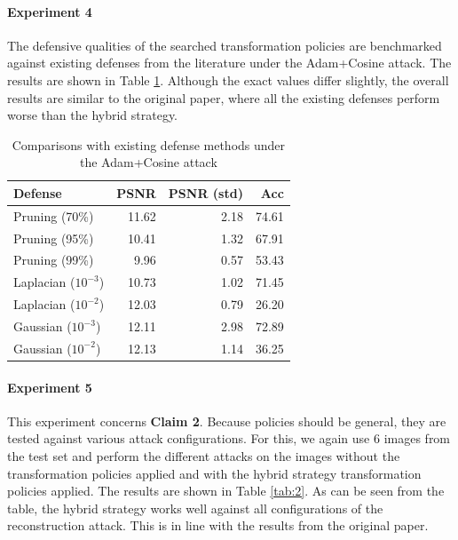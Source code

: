\paragraph{Experiment 4} The defensive qualities of the searched transformation policies are benchmarked against existing defenses from the literature \cite{zhu2019} \cite{wei2020} under the Adam+Cosine attack. The results are shown in Table \ref{tab:3}. Although the exact values differ slightly, the overall results are similar to the original paper, where all the existing defenses perform worse than the hybrid strategy.

\begin{table}[htb]
    \centering
        \begin{tabular}{lrrr}
        \hline
         Defense               &   PSNR &   PSNR (std) &   Acc \\
        \hline
         Pruning (70\%)         &       11.62 &       2.18 & 74.61 \\
         Pruning (95\%)         &       10.41 &       1.32 & 67.91 \\
         Pruning (99\%)         &        9.96 &       0.57 & 53.43 \\
         Laplacian ($10^{-3}$) &       10.73 &       1.02 & 71.45 \\
         Laplacian ($10^{-2}$) &       12.03 &       0.79 & 26.20 \\
         Gaussian ($10^{-3}$)  &       12.11 &       2.98 & 72.89 \\
         Gaussian ($10^{-2}$)  &       12.13 &       1.14 & 36.25 \\
        \hline
    \end{tabular}
    \caption{Comparisons with existing defense methods under the Adam+Cosine attack}
    \label{tab:3}
    \vspace{-8mm}
\end{table}

\paragraph{Experiment 5} This experiment concerns \textbf{Claim 2}. Because policies should be general, they are tested against various attack configurations. For this, we again use $6$ images from the test set and perform the different attacks on the images without the transformation policies applied and with the hybrid strategy transformation policies applied. The results are shown in Table \ref{tab:2}. As can be seen from the table, the hybrid strategy works well against all configurations of the reconstruction attack. This is in line with the results from the original paper.

